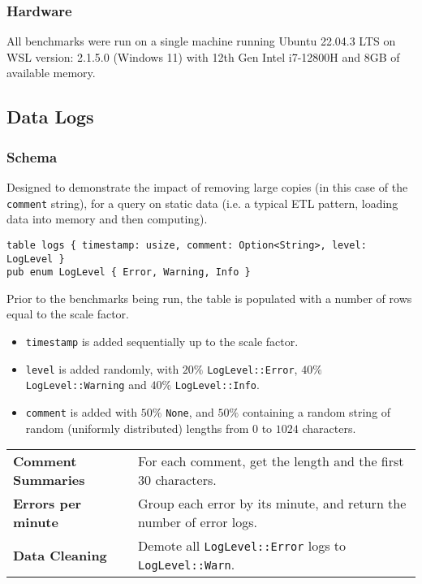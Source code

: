 \subsubsection{Hardware}
All benchmarks were run on a single machine running Ubuntu 22.04.3 LTS on WSL version: 2.1.5.0 (Windows 11) with 12th Gen Intel i7-12800H and 8GB of available memory.

\subsection{Data Logs}
\subsubsection{Schema}
Designed to demonstrate the impact of removing large copies (in this case of the \texttt{comment} string), for a query on static data (i.e. a typical ETL pattern, loading data into memory and then computing).
\begin{verbatim}
table logs { timestamp: usize, comment: Option<String>, level: LogLevel }
pub enum LogLevel { Error, Warning, Info }
\end{verbatim}
Prior to the benchmarks being run, the table is populated with a number of rows equal to the scale factor.
\begin{itemize}
    \setlength\itemsep{0em}
    \item \texttt{timestamp} is added sequentially up to the scale factor.
    \item \texttt{level} is added randomly, with $20\%$ \texttt{LogLevel::Error}, $40\%$ \texttt{LogLevel::Warning} and $40\%$ \texttt{LogLevel::Info}.
    \item \texttt{comment} is added with $50\%$ \texttt{None}, and $50\%$ containing a random string of random (uniformly distributed) lengths from $0$ to $1024$ characters.
\end{itemize}
\noindent
\begin{tabular}{l p{}}
    \textbf{Comment Summaries} & For each comment, get the length and the first 30 characters.                            \\
    \textbf{Errors per minute} & Group each error by its minute, and return the number of error logs.                     \\
    \textbf{Data Cleaning}     & Demote all \texttt{LogLevel::Error} logs to \texttt{LogLevel::Warn}. \\
\end{tabular}

